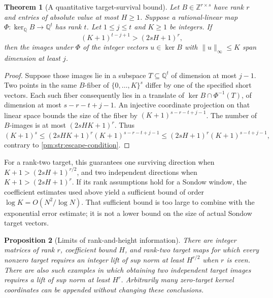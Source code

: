 \documentclass[11pt,a4paper]{article}
\newtheorem{theorem}{Theorem}[section]
\newtheorem{proposition}[theorem]{Proposition}
\theoremstyle{definition}
\theoremstyle{remark}
\numberwithin{equation}{section}
\begin{document}
\begin{theorem}[A quantitative target-survival bound]\label{pm:str:escape}
Let $B\in\mathbb Z^{r\times s}$ have rank $r$ and entries of
absolute value at most $H\geq1$.  Suppose a rational-linear map
$\Phi:\ker_{\mathbb Q}B\to\mathbb Q^t$ has rank $t$.
Let $1\leq j\leq t$ and $K\geq1$ be integers.  If
\begin{equation}\label{pm:str:escape-condition}
 (K+1)^{t-j+1}>(2sH+1)^r,
\end{equation}
then the images under $\Phi$ of the integer vectors
$u\in\ker B$ with $\|u\|_\infty\leq K$ span dimension at least $j$.
\end{theorem}

\begin{proof}
Suppose those images lie in a subspace $T\subseteq\mathbb Q^t$
of dimension at most $j-1$.  Two points in the same $B$-fiber of
$\{0,\ldots,K\}^s$ differ by one of the specified short vectors.
Each such fiber consequently lies in a translate of
$\ker B\cap\Phi^{-1}(T)$, of dimension at most
$s-r-t+j-1$.  An injective coordinate projection on that linear
space bounds the size of the fiber by
$(K+1)^{s-r-t+j-1}$.  The number of $B$-images is at most
$(2sHK+1)^r$.  Thus
\[
 (K+1)^s\leq(2sHK+1)^r(K+1)^{s-r-t+j-1}
 \leq(2sH+1)^r(K+1)^{s-t+j-1},
\]
contrary to \eqref{pm:str:escape-condition}.
\end{proof}

For a rank-two target, this guarantees one surviving direction when
$K+1>(2sH+1)^{r/2}$, and two independent directions when
$K+1>(2sH+1)^r$.  If its rank assumptions hold for a Sondow window,
the coefficient estimates used above yield a sufficient bound of
order $\log K=O(N^2/\log N)$.  That sufficient bound is too large
to combine with the exponential error estimate; it is not a lower
bound on the size of actual Sondow target vectors.

\begin{proposition}[Limits of rank-and-height information]
\label{pm:str:chain-examples}
There are integer matrices of rank $r$, coefficient bound $H$, and
rank-two target maps for which every nonzero target requires an
integer lift of sup norm at least $H^{r/2}$ when $r$ is even.
There are also such examples in which obtaining two independent
target images requires a lift of sup norm at least $H^r$.
Arbitrarily many zero-target kernel coordinates can be appended
without changing these conclusions.
\end{proposition}
\end{document}
